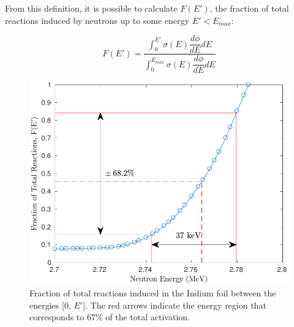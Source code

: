 \documentclass[5p]{elsarticle}
\newcommand{\pp}[1]{\left( #1\right)}
\newcommand{\comment}[1]{\todo[color=blue!20!white,inline]{ASV: #1}}
\begin{document}

From this definition, it is possible to calculate $F\pp{E'}$, the fraction of total reactions induced by neutrons up to some energy $E' < E_{max}$:

\begin{equation}\label{eqn:react_fraction}
F\pp{E'} = \dfrac{\int_0^{E'} \sigma(E) \dfrac{d\phi}{dE} dE}{\int_0^{E_{max}} \sigma(E) \dfrac{d\phi}{dE} dE}
\end{equation}




\begin{figure}
 \centering
 \includegraphics[scale=0.6]{./figures/fracplot_new.pdf}
 \caption{Fraction of total reactions induced in the Indium foil between the energies [0, $E'$]. The red arrows indicate the energy region that corresponds to 67\% of the total activation.}
 \label{fig:frac_plot}
\end{figure}
\end{document}
